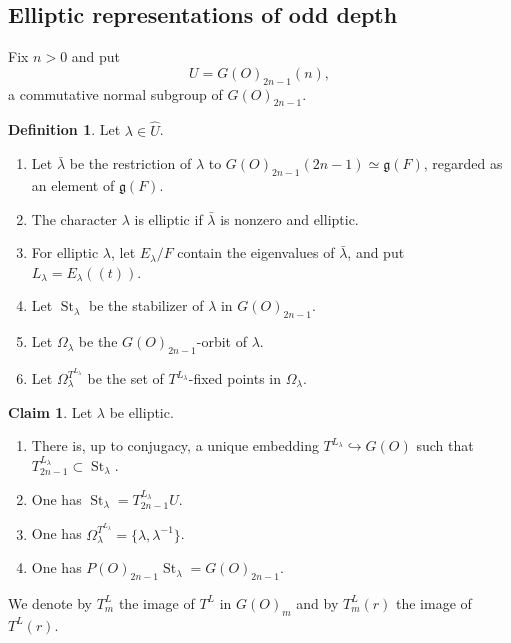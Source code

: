 \documentclass[11pt,a4paper,twoside]{amsart}
\theoremstyle{definition}
\newtheorem{definition}[theorem]{Definition}
\newtheorem{claim}[theorem]{Claim}
\theoremstyle{remark}
\newcommand{\ho}{\hookrightarrow}
\newcommand{\bO}{\Omega}
\newcommand{\bl}{\lambda}
\newcommand{\fg}{\mathfrak g}
\newcommand{\St}{\operatorname{St}}
\begin{document}
\subsection{Elliptic representations of odd depth}
Fix $n>0$ and put
$$
U=G(O)_{2n-1}(n),
$$
a commutative normal subgroup of $G(O)_{2n-1}$.
\begin{definition}\label{oddc}
Let $\bl\in\widehat U$.
\begin{enumerate}
\item Let $\bar\bl$ be the restriction of $\bl$ to $G(O)_{2n-1}(2n-1)\simeq\fg(F)$, regarded as an element of $\fg(F)$.
\item The character $\bl$ is elliptic if $\bar\bl$ is nonzero and elliptic.
\item For elliptic $\bl$, let $E_\bl/F$ contain the eigenvalues of $\bar\bl$, and put $L_\bl=E_\bl((t))$.
\item Let $\St_\bl$ be the stabilizer of $\bl$ in $G(O)_{2n-1}$.
\item Let $\bO_\bl$ be the $G(O)_{2n-1}$-orbit of $\bl$.
\item Let $\bO_\bl^{T^{L_\bl}}$ be the set of $T^{L_\bl}$-fixed points in $\bO_\bl$.
\end{enumerate}
\end{definition}
\begin{claim}\label{ellch}
Let $\bl$ be elliptic.
\begin{enumerate}
\item There is, up to conjugacy, a unique embedding $T^{L_\bl}\ho G(O)$ such that $T^{L_\bl}_{2n-1}\subset\St_\bl$.
\item One has $\St_\bl=T^{L_\bl}_{2n-1}U$.
\item One has $\bO_\bl^{T^{L_\bl}}=\{\bl,\bl^{-1}\}$.
\item One has $P(O)_{2n-1}\St_\bl=G(O)_{2n-1}$.
\end{enumerate}
\end{claim} We denote by $T^L_m$ the image of $T^L$ in $G(O)_m$ and by $T^L_m(r)$
the image of $T^L(r)$.
\end{document}
